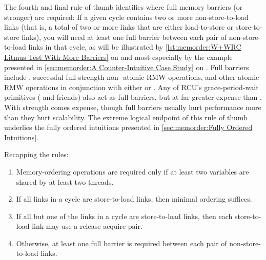 \QuickQuizEnd

The fourth and final rule of thumb identifies where full memory barriers
(or stronger) are required:
If a given cycle contains two or more non-store-to-load links (that is, a
total of two or more links that are either load-to-store or store-to-store
links), you will need at least one full barrier between each pair of
non-store-to-load links in that cycle, as will be illustrated by
\cref{lst:memorder:W+WRC Litmus Test With More Barriers}
on
and most especially by the example presented in
\cref{sec:memorder:A Counter-Intuitive Case Study}
on
.
Full barriers include , successful full-strength non-
atomic RMW operations, and other atomic RMW operations in conjunction with
either  or .
Any of RCU's grace-period-wait primitives ( and
friends) also act as full barriers, but at far greater expense than
.
With strength comes expense, though full barriers
usually hurt performance more than they hurt scalability.
The extreme logical endpoint of this rule of thumb underlies the
fully ordered intuitions presented in
\cref{sec:memorder:Fully Ordered Intuitions}.

Recapping the rules:

\begin{enumerate}
\item	Memory-ordering operations are required only if at least
	two variables are shared by at least two threads.
\item	If all links in a cycle are store-to-load links, then
	minimal ordering suffices.
\item	If all but one of the links in a cycle are store-to-load links,
	then each store-to-load link may use a release-acquire pair.
\item	Otherwise, at least one full barrier is required between
	each pair of non-store-to-load links.
\end{enumerate}

